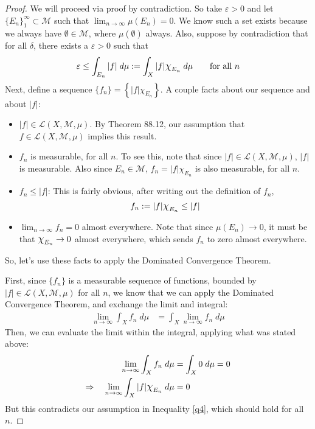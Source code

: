 \documentclass[12pt]{article}
\theoremstyle{plain}
\theoremstyle{definition}
\theoremstyle{remark}
\newcommand*{\Chi}{\mbox{\large$\chi$}} %
\begin{document}
\begin{proof}
We will proceed via proof by contradiction. So take $\varepsilon>0$ and let $\{E_n\}^\infty_1 \subset \mathscr{M}$ such that $\lim_{n\rightarrow\infty} \mu(E_n)=0$. We know such a set exists because we always have $\emptyset \in \mathscr{M}$, where $\mu(\emptyset)$ always. Also, suppose by contradiction that for all $\delta$, there exists a $\varepsilon>0$ such that 
\begin{equation}
    \label{q4}
    \varepsilon\leq \int_{E_n} |f| \; d\mu :=
    \int_X |f|\Chi_{E_n} \; d\mu
    \qquad\text{for all $n$}
\end{equation}
Next, define a sequence $\{f_n\}=\left\{|f|\chi_{E_n}\right\}$. A couple facts about our sequence and about $|f|$:
\begin{itemize}
    \item $|f|\in\mathscr{L}(X,\mathscr{M},\mu)$. By Theorem 88.12, our assumption that $f\in\mathscr{L}(X,\mathscr{M},\mu)$ implies this result.
    \item $f_n$ is measurable, for all $n$. To see this, note that since $|f|\in\mathscr{L}(X,\mathscr{M},\mu)$, $|f|$ is measurable. Also since $E_n\in\mathscr{M}$, $f_n = |f|\chi_{E_n}$ is also measurable, for all $n$.
    \item $f_n \leq |f|$: This is fairly obvious, after writing out the definition of $f_n$, 
\begin{equation}
    \label{dtcapply}
    f_n := |f|\Chi_{E_n}\leq |f|
\end{equation}
    \item $\lim_{n\rightarrow\infty}f_n=0$ almost everywhere. Note that since $\mu(E_n)\rightarrow 0$, it must be that $\Chi_{E_n}\rightarrow 0$ almost everywhere, which sends $f_n$ to zero almost everywhere.
\end{itemize}
So, let's use these facts to apply the Dominated Convergence Theorem. 

First, since $\{f_n\}$ is a measurable sequence of functions, bounded by $|f|\in\mathscr{L}(X,\mathscr{M},\mu)$ for all $n$, we know that we can apply the Dominated Convergence Theorem, and exchange the limit and integral:
\begin{align*}
    \lim_{n\rightarrow\infty} \int_X f_n \; d\mu&=
    \int_X \lim_{n\rightarrow\infty}f_n \; d\mu  
\end{align*}
Then, we can evaluate the limit within the integral, applying what was stated above:
\begin{align*}
    \lim_{n\rightarrow\infty} \int_X f_n \; d\mu &=
    \int_X 0 \; d\mu = 0 \\ 
    \Rightarrow\quad
    \lim_{n\rightarrow\infty} \int_X |f|\Chi_{E_n} \; 
    d\mu &= 0
\end{align*}
But this contradicts our assumption in Inequality \ref{q4}, which should hold for all $n$.
\end{proof}
\end{document}
